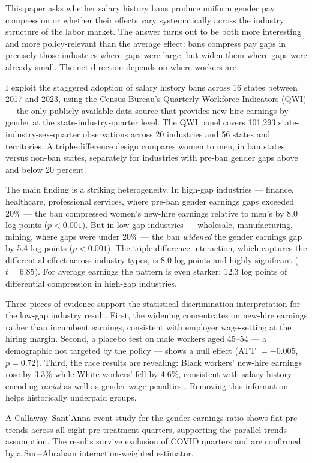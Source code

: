 \documentclass[12pt]{article}
\begin{document}
This paper asks whether salary history bans produce uniform gender pay compression or whether their effects vary systematically across the industry structure of the labor market. The answer turns out to be both more interesting and more policy-relevant than the average effect: bans compress pay gaps in precisely those industries where gaps were large, but widen them where gaps were already small. The net direction depends on where workers are.

I exploit the staggered adoption of salary history bans across 16 states between 2017 and 2023, using the Census Bureau's Quarterly Workforce Indicators (QWI) --- the only publicly available data source that provides new-hire earnings by gender at the state-industry-quarter level. The QWI panel covers 101,293 state-industry-sex-quarter observations across 20 industries and 56 states and territories. A triple-difference design compares women to men, in ban states versus non-ban states, separately for industries with pre-ban gender gaps above and below 20 percent.

The main finding is a striking heterogeneity. In high-gap industries --- finance, healthcare, professional services, where pre-ban gender earnings gaps exceeded 20\% --- the ban compressed women's new-hire earnings relative to men's by 8.0 log points ($p < 0.001$). But in low-gap industries --- wholesale, manufacturing, mining, where gaps were under 20\% --- the ban \emph{widened} the gender earnings gap by 5.4 log points ($p < 0.001$). The triple-difference interaction, which captures the differential effect across industry types, is 8.0 log points and highly significant ($t = 6.85$). For average earnings the pattern is even starker: 12.3 log points of differential compression in high-gap industries.

Three pieces of evidence support the statistical discrimination interpretation for the low-gap industry result. First, the widening concentrates on new-hire earnings rather than incumbent earnings, consistent with employer wage-setting at the hiring margin. Second, a placebo test on male workers aged 45--54 --- a demographic not targeted by the policy --- shows a null effect (ATT $= -0.005$, $p = 0.72$). Third, the race results are revealing: Black workers' new-hire earnings rose by 3.3\% while White workers' fell by 4.6\%, consistent with salary history encoding \emph{racial} as well as gender wage penalties \citep{Burn2023}. Removing this information helps historically underpaid groups.

A Callaway--Sant'Anna event study for the gender earnings ratio shows flat pre-trends across all eight pre-treatment quarters, supporting the parallel trends assumption. The results survive exclusion of COVID quarters and are confirmed by a Sun--Abraham interaction-weighted estimator.
\end{document}
